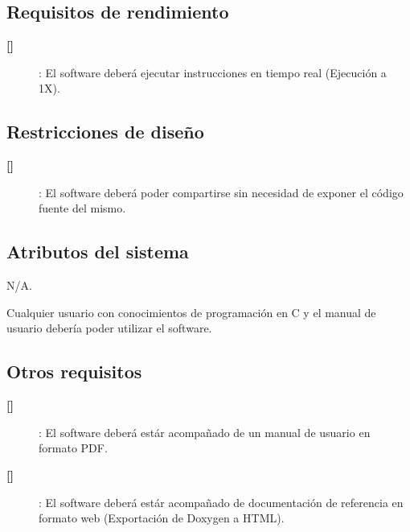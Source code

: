 \documentclass[
  11pt, %
  codirector, %
]{charter}
\makeatletter
\newcommand{\mytwodigits}[1]{\two@digits{#1}}
\newcounter{reqCounter}
\makeatother
\begin{document}
\subsection{Requisitos de rendimiento}
\label{sec:org94bc543}

\begin{description}

\item[\textbf{[\CODrequerimiento\mytwodigits{\value{reqCounter}}]}]: El software deberá ejecutar instrucciones en tiempo real (Ejecución a 1X).

\end{description}


\subsection{Restricciones de diseño}
\label{sec:org49fe900}

\begin{description}

\item[\textbf{[\CODrequerimiento\mytwodigits{\value{reqCounter}}]}]: El software deberá poder compartirse sin necesidad de exponer el código fuente del mismo.

\end{description}


\subsection{Atributos del sistema}
\label{sec:orgd0babc0}

N/A.

Cualquier usuario con conocimientos de programación en C y el manual de usuario debería poder utilizar el software.

\subsection{Otros requisitos}
\label{sec:org31d2978}

\begin{description}

\item[\textbf{[\CODrequerimiento\mytwodigits{\value{reqCounter}}]}]: El software deberá estár acompañado de un manual de usuario en formato PDF.

\item[\textbf{[\CODrequerimiento\mytwodigits{\value{reqCounter}}]}]: El software deberá estár acompañado de documentación de referencia en formato web (Exportación de Doxygen a HTML).


\end{description}
\end{document}
